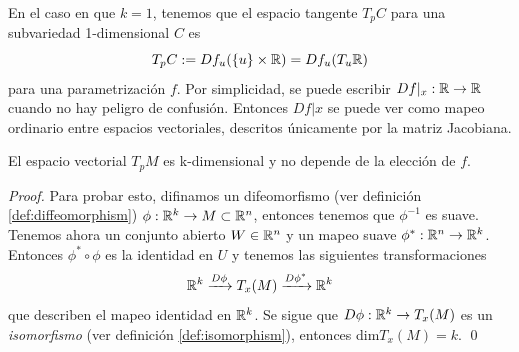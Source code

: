 \begin{example}
    En el caso en que $k=1$, tenemos que el espacio tangente $T_{p}C$ para una subvariedad 1-dimensional
    $C$ es
    $$ T_{p}C := Df_{u}(\{u\} \times \mathbb{R})=Df_{u}(T_{u}\mathbb{R}) $$
    para una parametrizaci\'on $f$. Por simplicidad, se puede escribir $Df|_{x}: \mathbb{R} \rightarrow \mathbb{R}$
    cuando no hay peligro de confusi\'on. Entonces $Df|x$ se puede ver como mapeo
    ordinario entre espacios vectoriales, descritos \'unicamente por la matriz Jacobiana.
\end{example}

\begin{proposition}
    El espacio vectorial $T_{p}M$ es k-dimensional y no depende de la elecci\'on de $f$.
\end{proposition}
\begin{proof}
    Para probar esto, difinamos un difeomorfismo (ver definici\'on \ref{def:diffeomorphism}) $\phi: \mathbb{R}^{k} \rightarrow M \subset \mathbb{R}^{n}$,
    entonces tenemos que $\phi^{-1}$ es suave. Tenemos ahora un conjunto abierto $W \in \mathbb{R}^{n}$ y
    un mapeo suave $\phi^{*}:\mathbb{R}^{n} \rightarrow \mathbb{R}^{k}$. Entonces $\phi^{*} \circ \phi$ es la
    identidad en $U$ y tenemos las siguientes transformaciones
    $$\mathbb{R}^{k} \xrightarrow{D\phi} T_{x}(M) \xrightarrow{D\phi^{*}} \mathbb{R}^{k} $$
    que describen el mapeo identidad en $\mathbb{R}^{k}$. Se sigue que $D\phi:\mathbb{R}^{k} \rightarrow T_{x}(M)$
    es un \emph{isomorfismo} (ver definici\'on \ref{def:isomorphism}), entonces dim$T_{x}(M)=k$. \qed
\end{proof}
